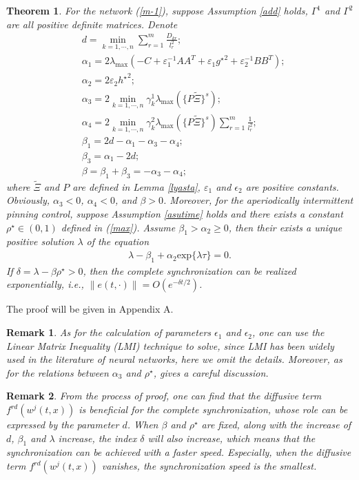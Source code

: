 \documentclass[review]{elsarticle}
\newtheorem{thm}{Theorem}
\newtheorem{rem}{Remark}
\begin{document}
\begin{thm}\label{thm1}
For the network (\ref{m-1}), suppose Assumption \ref{add} holds, $\Gamma^1$ and $\Gamma^2$ are all positive definite matrices. Denote
\begin{align}
&d=\min_{k=1,\cdots,n}\sum_{r=1}^m\frac{D_{kr}}{l_r^2};\label{wa1}\\
&\alpha_1=2\lambda_{\max}(-C+\varepsilon_1^{-1}AA^T+\varepsilon_1{g^{\star}}^2+\varepsilon_2^{-1}BB^T);\label{w2}\\
&\alpha_2=2\varepsilon_2{h^{\star}}^2;\label{w3}\\
&\alpha_3=2\min_{k=1,\cdots,n}\gamma_k^1\lambda_{\max}(\{P\tilde{\Xi}\}^s);\label{w4}\\
&\alpha_4=2\min_{k=1,\cdots,n}\gamma_k^2\lambda_{\max}(\{P\tilde{\Xi}\}^s)\sum_{r=1}^m\frac{1}{l_r^2};\label{w5}\\
&\beta_1=2d-\alpha_1-\alpha_3-\alpha_4;\label{w6}\\
&\beta_3=\alpha_1-2d;\label{w7}\\
&\beta=\beta_1+\beta_3=-\alpha_3-\alpha_4;\label{w8}
\end{align}
where $\tilde{\Xi}$ and $P$ are defined in Lemma \ref{lyasta}, $\varepsilon_1$ and $\epsilon_2$ are positive constants. Obviously, $\alpha_3<0$, $\alpha_4<0$, and $\beta>0$. Moreover, for the aperiodically intermittent pinning control, suppose Assumption \ref{asutime} holds and there exists a constant $\rho^{\star}\in (0,1)$ defined in (\ref{max}). Assume $\beta_1>\alpha_2\geq 0$, then their exists a unique positive solution $\lambda$ of the equation
\begin{align*}
\lambda-\beta_1+\alpha_2 \mathrm{exp}\{\lambda{\tau}\}=0.
\end{align*}
If $\delta=\lambda-\beta\rho^{\star}>0$, then the complete synchronization can be realized exponentially, i.e., $\|e(t,\cdot)\|=O(e^{-\delta t/2})$.
\end{thm}
The proof will be given in Appendix A.

\begin{rem}\label{lmi}
As for the calculation of parameters $\epsilon_1$ and $\epsilon_2$, one can use the Linear Matrix Inequality (LMI) technique to solve, since LMI has been widely used in the literature of neural networks, here we omit the details. Moreover, as for the relations between $\alpha_3$ and $\rho^{\star}$, \cite{LL16} gives a careful discussion.
\end{rem}

\begin{rem}\label{red}
From the process of proof, one can find that the diffusive term $f^{rd}(w^j(t,x))$ is beneficial for the complete synchronization, whose role can be expressed by the parameter $d$. When $\beta$ and $\rho^{\star}$ are fixed, along with the increase of $d$, $\beta_1$ and $\lambda$ increase, the index $\delta$ will also increase, which means that the synchronization can be achieved with a faster speed. Especially, when the diffusive term $f^{rd}(w^j(t,x))$ vanishes, the synchronization speed is the smallest.
\end{rem}
\end{document}
